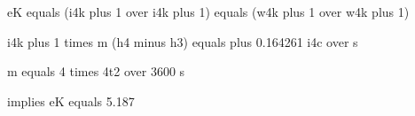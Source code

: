 eK equals (i4k plus 1 over i4k plus 1) equals (w4k plus 1 over w4k plus 1)  

i4k plus 1 times m (h4 minus h3) equals plus 0.164261 i4c over s  

m equals 4 times 4t2 over 3600 s  

implies eK equals 5.187